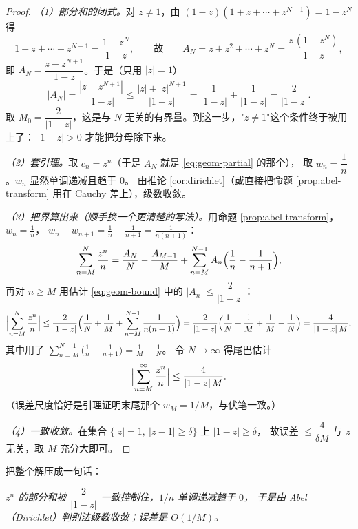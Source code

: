 \begin{proof}
\emph{（1）部分和的闭式。}对 $z\ne1$，由 $(1-z)(1+z+\cdots+z^{N-1})=1-z^{N}$ 得
\begin{equation}\label{eq:geom-partial}
1+z+\cdots+z^{N-1}=\frac{1-z^{N}}{1-z},
\qquad\text{故}\qquad
A_N=z+z^2+\cdots+z^{N}=\frac{z\,(1-z^{N})}{1-z},
\end{equation}
即 $A_N=\dfrac{z-z^{N+1}}{1-z}$。于是（只用 $|z|=1$）
\begin{equation}\label{eq:geom-bound}
|A_N|=\frac{|z-z^{N+1}|}{|1-z|}\le\frac{|z|+|z|^{N+1}}{|1-z|}
=\frac1{|1-z|}+\frac1{|1-z|}=\frac{2}{|1-z|}.
\end{equation}
取 $M_0=\dfrac{2}{|1-z|}$，这是与 $N$ 无关的有界量。到这一步，"$z\ne1$"这个条件终于被用上了：
$|1-z|>0$ 才能把分母除下来。

\emph{（2）套引理。}取 $c_n=z^n$（于是 $A_N$ 就是 \eqref{eq:geom-partial} 的那个），
取 $w_n=\dfrac1n$。$w_n$ 显然单调递减且趋于 $0$。
由推论 \ref{cor:dirichlet}（或直接把命题 \ref{prop:abel-transform} 用在 Cauchy 差上），级数收敛。

\emph{（3）把界算出来（顺手换一个更清楚的写法）。}用命题 \ref{prop:abel-transform}，$w_n=\frac1n$，
$w_n-w_{n+1}=\frac{1}{n}-\frac{1}{n+1}=\frac{1}{n(n+1)}$：
\[
\sum_{n=M}^{N}\frac{z^n}{n}
=\frac{A_N}{N}-\frac{A_{M-1}}{M}+\sum_{n=M}^{N-1}A_n\Bigl(\frac1n-\frac1{n+1}\Bigr),
\]
再对 $n\ge M$ 用估计 \eqref{eq:geom-bound} 中的 $|A_n|\le\dfrac{2}{|1-z|}$：
\[
\Bigl|\sum_{n=M}^{N}\frac{z^n}{n}\Bigr|
\le\frac{2}{|1-z|}\Bigl(\frac1N+\frac1M+\sum_{n=M}^{N-1}\frac{1}{n(n+1)}\Bigr)
=\frac{2}{|1-z|}\Bigl(\frac1N+\frac1M+\frac1M-\frac1N\Bigr)
=\frac{4}{|1-z|\,M},
\]
其中用了 $\sum_{n=M}^{N-1}\bigl(\frac1n-\frac1{n+1}\bigr)=\frac1M-\frac1N$。
令 $N\to\infty$ 得尾巴估计
\begin{equation}\label{eq:tail-bound}
\Bigl|\sum_{n=M}^{\infty}\frac{z^n}{n}\Bigr|\le\frac{4}{|1-z|\,M}.
\end{equation}
（误差尺度恰好是引理证明末尾那个 $w_M=1/M$，与伏笔一致。）

\emph{（4）一致收敛。}在集合 $\{|z|=1,\ |z-1|\ge\delta\}$ 上 $|1-z|\ge\delta$，
故误差 $\le\dfrac{4}{\delta M}$ 与 $z$ 无关，取 $M$ 充分大即可。
\end{proof}

\noindent
把整个解压成一句话：
\begin{center}
\emph{$z^n$ 的部分和被 $\dfrac{2}{|1-z|}$ 一致控制住，$1/n$ 单调递减趋于 $0$，
于是由 Abel（Dirichlet）判别法级数收敛；误差是 $O(1/M)$。}
\end{center}

